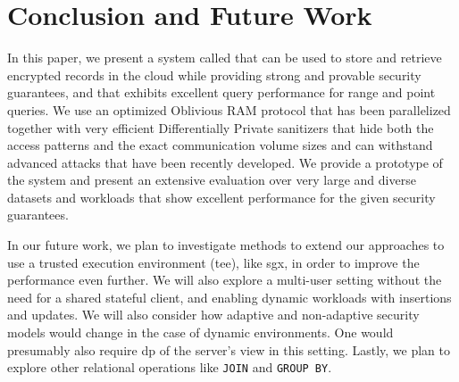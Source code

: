 \section{Conclusion and Future Work}

	In this paper, we present a system called \epsolute{} that can be used to store and retrieve encrypted records in the cloud while providing strong and provable security guarantees, and that exhibits excellent query performance for range and point queries.
	We use an optimized Oblivious RAM protocol that has been parallelized together with very efficient Differentially Private sanitizers that hide both the access patterns and the exact communication volume sizes and can withstand advanced attacks that have been recently developed.
	We provide a prototype of the system and present an extensive evaluation over very large and diverse datasets and workloads that show excellent performance for the given security guarantees.

	In our future work, we plan to investigate methods to extend our approaches to use a trusted execution environment (\acrshort{tee}), like \acrshort{sgx}, in order to improve the performance even further.
	We will also explore a multi-user setting without the need for a shared stateful client, and enabling dynamic workloads with insertions and updates.
	We will also consider how adaptive and non-adaptive security models would change in the case of dynamic environments.
	One would presumably also require \acrshort{dp} of the server's view in this setting.
	Lastly, we plan to explore other relational operations like \texttt{JOIN} and \texttt{GROUP BY}.
